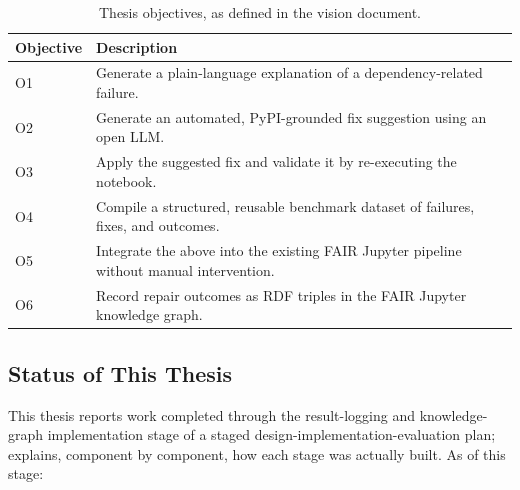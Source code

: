\begin{table}[h]
  \centering
  \begin{tabular}{|l|p{10.5cm}|}
    \hline
    \textbf{Objective} & \textbf{Description} \\
    \hline
    O1 & Generate a plain-language explanation of a dependency-related failure. \\
    \hline
    O2 & Generate an automated, PyPI-grounded fix suggestion using an open LLM. \\
    \hline
    O3 & Apply the suggested fix and validate it by re-executing the notebook. \\
    \hline
    O4 & Compile a structured, reusable benchmark dataset of failures, fixes, and outcomes. \\
    \hline
    O5 & Integrate the above into the existing FAIR Jupyter pipeline without manual intervention. \\
    \hline
    O6 & Record repair outcomes as RDF triples in the FAIR Jupyter knowledge graph. \\
    \hline
  \end{tabular}
  \caption{Thesis objectives, as defined in the vision document.}
  \label{tab:intro-objectives}
\end{table}

\subsection{Status of This Thesis}
\label{sec:intro-status}

This thesis reports work completed through the result-logging and
knowledge-graph implementation stage of a staged
design-implementation-evaluation plan;  explains,
component by component,
how each stage was actually built. As of this stage:

